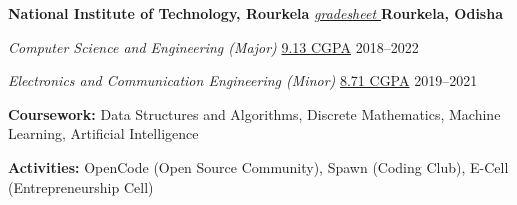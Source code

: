 \textbf{National Institute of Technology, Rourkela} \emph{\href{https://drive.google.com/drive/u/0/folders/1qHB41TjLRWeAvqkQZ-Yq2LBOtAfxE8Ju}{gradesheet }} \hfill \textbf{Rourkela, Odisha} \par
\textit{Computer Science and Engineering (Major)} \href{https://drive.google.com/file/d/1gWxe3KDzVqNFzYupZ7N3swfAxDCab9so/view?usp=sharing}{9.13 CGPA} \hfill 2018--2022\par
\textit{Electronics and Communication Engineering (Minor)} \href{https://drive.google.com/file/d/1gWxe3KDzVqNFzYupZ7N3swfAxDCab9so/view?usp=sharing}{8.71 CGPA} \hfill 2019--2021\par
\textbf{Coursework:} Data Structures and Algorithms, Discrete Mathematics, Machine Learning, Artificial Intelligence \par
\textbf{Activities:} OpenCode (Open Source Community), Spawn (Coding Club), E-Cell (Entrepreneurship Cell)
